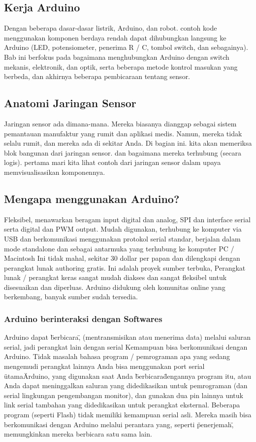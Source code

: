 \subsection{Kerja Arduino}
Dengan beberapa dasar-dasar listrik, Arduino, dan robot.
contoh kode menggunakan komponen berdaya rendah dapat dihubungkan langsung ke Arduino (LED, potensiometer, penerima R / C, tombol switch, dan sebagainya). 
Bab ini berfokus pada bagaimana menghubungkan Arduino dengan switch mekanis, elektronik, dan optik, serta beberapa metode kontrol masukan yang berbeda, dan akhirnya beberapa pembicaraan tentang sensor.

\subsection{Anatomi Jaringan Sensor}
Jaringan sensor ada dimana-mana. Mereka biasanya dianggap sebagai sistem pemantauan manufaktur yang rumit
dan aplikasi medis. Namun, mereka tidak selalu rumit, dan mereka ada di sekitar Anda.
Di bagian ini. kita akan memeriksa blok bangunan dari jaringan sensor. dan bagaimana mereka terhubung (secara logis).
pertama mari kita lihat contoh dari jaringan sensor dalam upaya memvisualisasikan komponennya.

\subsection{Mengapa menggunakan Arduino?}
Fleksibel, menawarkan beragam input digital dan analog, SPI dan interface serial serta digital dan PWM
output. Mudah digunakan, terhubung ke komputer via USB dan berkomunikasi menggunakan protokol serial standar, berjalan
dalam mode standalone dan sebagai antarmuka yang terhubung ke komputer PC / Macintosh
Ini tidak mahal, sekitar 30 dollar per papan dan dilengkapi dengan perangkat lunak authoring gratis. Ini adalah proyek sumber terbuka,
Perangkat lunak / perangkat keras sangat mudah diakses dan sangat fleksibel untuk disesuaikan dan diperluas. Arduino didukung
oleh komunitas online yang berkembang, banyak sumber sudah tersedia.

\subsubsection{Arduino berinteraksi dengan Softwares}
Arduino dapat \"berbicara\", (mentransmisikan atau menerima data) melalui saluran serial, jadi perangkat lain dengan serial
Kemampuan bisa berkomunikasi dengan Arduino. Tidak masalah bahasa program / pemrograman apa yang sedang mengemudi
perangkat lainnya Anda bisa menggunakan port serial \"utama\" Arduino, yang digunakan saat Anda \"berbicara\" dengannya
program itu, atau Anda dapat meninggalkan saluran yang didedikasikan untuk pemrograman (dan serial lingkungan pengembangan
monitor), dan gunakan dua pin lainnya untuk link serial tambahan yang didedikasikan untuk perangkat eksternal. Beberapa program (seperti
Flash) tidak memiliki kemampuan serial asli. Mereka masih bisa berkomunikasi dengan Arduino melalui perantara
yang, seperti \"penerjemah\", memungkinkan mereka berbicara satu sama lain.


